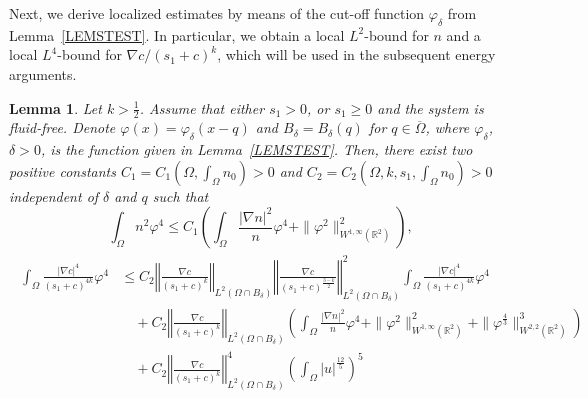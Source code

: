 \documentclass{amsart}
\newtheorem{lemma}[defn]{Lemma}
\numberwithin{equation}{section}
\newcommand{\R}{{ \mathbb{R}  }}
\newcommand{\bke}[1]{\left( #1 \right)}
\newcommand{\norm}[1]{\left\Vert #1 \right\Vert}
\begin{document}


Next, we derive localized estimates by means of the cut-off function $\varphi_\delta$ from Lemma~\ref{LEMSTEST}.
In particular, we obtain a local $L^2$-bound for $n$ and a local $L^4$-bound for $\nabla c/(s_1+c)^k$, which will be used in the subsequent energy arguments.


\begin{lemma}\label{LEMLOCINT}
Let $k>\frac{1}{2}$.
Assume that either $s_{1}>0$, or $s_{1}\ge0$ and the system is fluid-free.
Denote $\varphi(x)=\varphi_{\delta}(x-q)$ and $B_{\delta}=B_{\delta}(q)$  for $q\in\overline{\Omega}$, where $\varphi_{\delta}$, $\delta>0$,  is the function given in   Lemma~\ref{LEMSTEST}. 
Then, there exist two positive constants $C_{1}=C_1(\Omega, \int_{\Omega} n_0) >0$ and  $C_2=C_2(\Omega, k, s_1, \int_{\Omega} n_0)>0$ independent of $\delta$ and $q$  such that
\begin{equation}\label{LEMLOCINT1}
\int_{\Omega}n^{2}\varphi^{4}
 \le C_{1} \bke{  \int_{\Omega} \frac{|\nabla n|^{2}}{n}\varphi^{4}  +\| \varphi^{2}  \|_{W^{1,\infty}(\R^{2})}^{2}},
\end{equation}
\begin{align}\label{LEMLOCINT2}
\begin{aligned} 
 \int_{\Omega} \frac{|\nabla c|^{4}}{(s_{1}+c)^{4k}}\varphi^{4}
 &\le  C_{2}\norm{\frac{\nabla c}{(s_{1}+c)^{k}}}_{L^{2}(\Omega\cap B_{\delta})} \norm{\frac{\nabla c}{(s_{1}+c)^{\frac{3-k}{2}}}}_{L^{2}(\Omega\cap B_{\delta})}^{2}  \int_{\Omega} \frac{|\nabla c|^{4}}{(s_{1}+c)^{4k}}\varphi^{4}
   \\
 &\quad +  C_{2}\norm{\frac{\nabla c}{(s_{1}+c)^{k}}}_{L^{2}(\Omega\cap B_{\delta})}
\bke{   \int_{\Omega} \frac{|\nabla n|^{2}}{n}\varphi^{4}  +\| \varphi^{2}  \|_{W^{1,\infty}(\R^{2})}^{2}  +\|\varphi^{\frac{4}{3}}\|_{W^{2,2}(\R^{2})}^{3}} \\
&\quad +C_{2} \norm{\frac{\nabla c}{(s_{1}+c)^{k}}}^{4}_{L^{2}(\Omega\cap B_{\delta})} \bke{\int_{\Omega}|u|^{\frac{12}{5}} }^{5}
\end{aligned}
\end{align}
\end{lemma}
\end{document}
